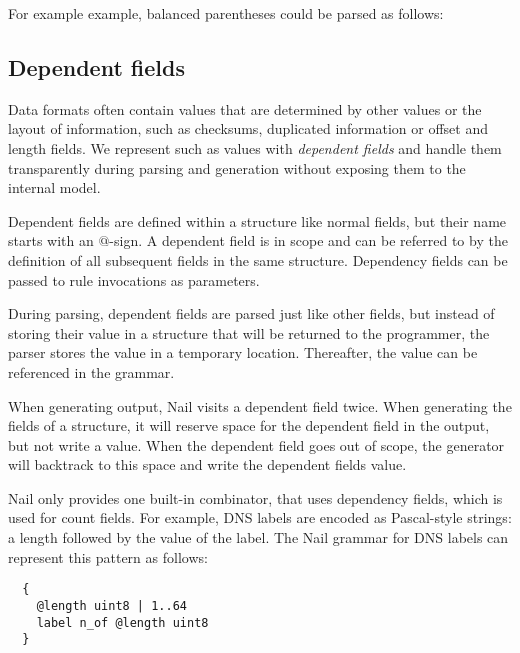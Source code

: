 For example example,   balanced parentheses could be parsed as follows: 




\subsection{Dependent fields}
\label{s:dependent}
Data formats often contain values that are determined by other values or the layout of information,
such as checksums, duplicated information  or offset and  length fields.
We represent such as values with \emph{dependent fields} and handle them transparently during
parsing and generation without exposing them to the internal model. 


Dependent fields are defined within a structure like normal fields, but their name starts with an $@$-sign. 
A dependent field is in scope and can be referred to by the definition of all subsequent fields in
the same structure. Dependency fields can be passed to rule invocations as parameters.

During parsing, dependent fields are parsed just like other fields, but instead of storing their
value in a structure that will be returned to the programmer, the parser stores the value in a
temporary location. Thereafter, the value can be referenced in the grammar. 

When generating output, Nail visits a dependent field twice. When generating the fields of a
structure, it will reserve space for the dependent field in the output, but not write a value. When
the dependent field goes out of scope, the generator will backtrack to this space and write the
dependent fields value.

Nail only provides one built-in combinator,  that uses dependency fields, which is used
for count fields. For example, DNS labels are encoded as Pascal-style strings: a length followed by
the value of the label. The Nail grammar for DNS labels can represent
this pattern as follows:

{
\smaller[0.5]
\begin{verbatim}
  {
    @length uint8 | 1..64
    label n_of @length uint8
  }
\end{verbatim}
}

